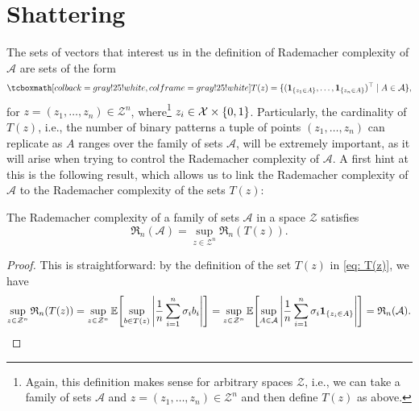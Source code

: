 \section{Shattering}
\label{sec: shattering}

The sets of vectors that interest us in the definition of Rademacher complexity of
$\mathcal{A}$ are sets of the form
\begin{equation}
\label{eq: T(z)}
    \highlightMath{
        T(z) = \{(\indSet{z_1 \in A}, \dots, \indSet{z_n \in A})^{\top} \with A \in \mathcal{A}\},
    }
\end{equation}
for $z = (z_1, \dots, z_n) \in \mathcal{Z}^n$, where\footnote{Again, this definition makes sense for arbitrary spaces $\mathcal{Z}$, i.e., we can take a family of sets $\mathcal{A}$ and $z = (z_1, \dots, z_n) \in \mathcal{Z}^n$ and then define $T(z)$ as above.} $z_i \in \mathcal{X} \times \set{0, 1}$. Particularly, the cardinality of $T(z)$, i.e., the number of binary patterns a tuple of points $(z_1, \dots, z_n)$ can replicate as $A$ ranges over the family of sets $\mathcal{A}$, will be extremely important, as it will arise when trying to control the Rademacher complexity of $\mathcal{A}$. A first hint at this is the following result, which allows us to link the Rademacher complexity of $\mathcal{A}$ to the Rademacher complexity of the sets $T(z)$:

\begin{lemma}
\label{lem: rademacher complexity of family of sets}
The Rademacher complexity of a family of sets $\mathcal{A}$ in a space $\mathcal{Z}$ satisfies
\[
    \mathfrak{R}_n(\mathcal{A}) = \sup_{z \in \mathcal{Z}^n} \mathfrak{R}_n(T(z)).
\]
\end{lemma}

\begin{proof}
This is straightforward: by the definition of the set $T(z)$ in \eqref{eq: T(z)}, we have
\[
    \sup_{z \in \mathcal{Z}^n} \mathfrak{R}_n(T(z)) = \sup_{z \in \mathcal{Z}^n} \Exp\left[\sup_{b \in T(z)} \abs{\frac{1}{n} \sum_{i=1}^n \sigma_i b_i}\right] = \sup_{z \in \mathcal{Z}^n} \Exp\left[\sup_{A \in \mathcal{A}} \abs{\frac{1}{n} \sum_{i=1}^n \sigma_i \indSet{z_i \in A}}\right] = \mathfrak{R}_n(\mathcal{A}). \qedhere
\]
\end{proof}

